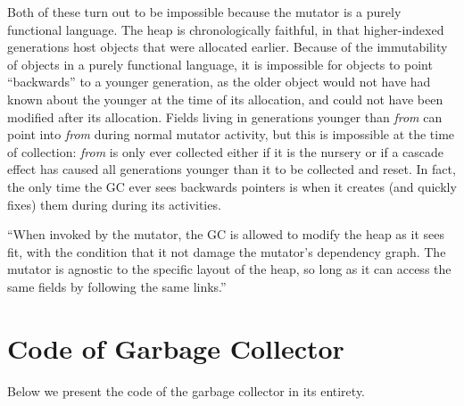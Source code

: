 Both of these turn out to be impossible because the 
{\color{magenta}mutator is a purely functional language.}
The heap is chronologically
faithful, in that higher-indexed generations host
objects that were allocated earlier. Because
of the immutability of objects in a purely functional language, 
it is impossible for objects to point ``backwards'' to 
a younger generation, as the older object would not have
had known about the younger at the time of its allocation, and could not 
have been modified after its allocation. Fields living in generations 
younger than \emph{from} can point into \emph{from} during 
normal mutator activity, but this is
impossible at the time of collection: 
\emph{from} is only ever collected either if it is
the nursery or if a cascade effect has caused all generations younger
than it to be collected and reset. 
In fact, the only time the GC ever sees backwards pointers
is when it creates (and quickly fixes) them during during its 
activities.



``When invoked by the mutator, the GC 
is allowed to modify the heap as
it sees fit, with the condition that it not damage the 
mutator's dependency graph. The mutator is agnostic 
to the specific layout of the heap, so long as 
it can access the same fields by following the same 
links.''



\section{Code of Garbage Collector}

Below we present the code of the garbage collector in its entirety.


